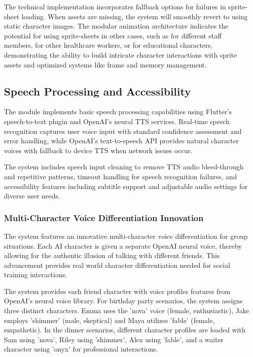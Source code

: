 \documentclass[MScCS]{uccthesis}
\begin{document}
The technical implementation incorporates fallback options for failures in sprite-sheet loading. When assets are missing, the system will smoothly revert to using static character images. The modular animation architecture indicates the potential for using sprite-sheets in other cases, such as for different staff members, for other healthcare workers, or for educational characters, demonstrating the ability to build intricate character interactions with sprite assets and optimized systems like frame and memory management.

\subsection{Speech Processing and Accessibility}

The module implements basic speech processing capabilities using Flutter's speech-to-text plugin and OpenAI's neural TTS services. Real-time speech recognition captures user voice input with standard confidence assessment and error handling, while OpenAI's text-to-speech API provides natural character voices with fallback to device TTS when network issues occur.

The system includes speech input cleaning to remove TTS audio bleed-through and repetitive patterns, timeout handling for speech recognition failures, and accessibility features including subtitle support and adjustable audio settings for diverse user needs.

\subsubsection{Multi-Character Voice Differentiation Innovation}

The system features an innovative multi-character voice differentiation for group situations. Each AI character is given a separate OpenAI neural voice, thereby allowing for the authentic illusion of talking with different friends. This advancement provides real world character differentiation needed for social training interactions. 

The system provides each friend character with voice profiles features from OpenAI's neural voice library. For birthday party scenarios, the system assigns three distinct characters. Emma uses the 'nova' voice (female, enthusiastic), Jake employs 'shimmer' (male, skeptical) and Maya utilizes 'fable' (female, empathetic). In the dinner scenarios, different character profiles are loaded with Sam using 'nova', Riley using 'shimmer', Alex using 'fable', and a waiter character using 'onyx' for professional interactions. 
\end{document}
